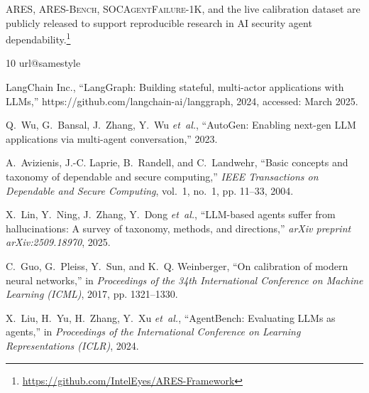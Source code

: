 \documentclass[journal,compsoc]{IEEEtran}
\newcommand{\ARES}{\textsc{ARES}}
\newcommand{\ARESBench}{\textsc{ARES-Bench}}
\newcommand{\SAFK}{\textsc{SOCAgentFailure-1K}}
\begin{document}
\ARES{}, \ARESBench{}, \SAFK{}, and the live calibration dataset are
publicly released to support reproducible research in AI security agent
dependability.\footnote{\url{https://github.com/IntelEyes/ARES-Framework}}


\begin{thebibliography}{10}
\providecommand{\url}[1]{#1}
\csname url@samestyle\endcsname
\providecommand{\newblock}{\relax}
\providecommand{\bibinfo}[2]{#2}
\providecommand{\BIBentrySTDinterwordspacing}{\spaceskip=0pt\relax}
\providecommand{\BIBentryALTinterwordstretchfactor}{4}
\providecommand{\BIBentryALTinterwordspacing}{\spaceskip=\fontdimen2\font plus
\BIBentryALTinterwordstretchfactor\fontdimen3\font minus
  \fontdimen4\font\relax}
\providecommand{\BIBforeignlanguage}[2]{{%
\expandafter\ifx\csname l@#1\endcsname\relax
\typeout{** WARNING: IEEEtran.bst: No hyphenation pattern has been}%
\typeout{** loaded for the language `#1'. Using the pattern for}%
\typeout{** the default language instead.}%
\else
\language=\csname l@#1\endcsname
\fi
#2}}
\providecommand{\BIBdecl}{\relax}
\BIBdecl

{LangChain Inc.}, ``{LangGraph}: Building stateful, multi-actor applications
  with {LLMs},'' \url{https://github.com/langchain-ai/langgraph}, 2024,
  accessed: March 2025.

Q.~Wu, G.~Bansal, J.~Zhang, Y.~Wu \emph{et~al.}, ``{AutoGen}: Enabling next-gen
  {LLM} applications via multi-agent conversation,'' 2023.

A.~Avizienis, J.-C. Laprie, B.~Randell, and C.~Landwehr, ``Basic concepts and
  taxonomy of dependable and secure computing,'' \emph{IEEE Transactions on
  Dependable and Secure Computing}, vol.~1, no.~1, pp. 11--33, 2004.

X.~Lin, Y.~Ning, J.~Zhang, Y.~Dong \emph{et~al.}, ``{LLM}-based agents suffer
  from hallucinations: A survey of taxonomy, methods, and directions,''
  \emph{arXiv preprint arXiv:2509.18970}, 2025.

C.~Guo, G.~Pleiss, Y.~Sun, and K.~Q. Weinberger, ``On calibration of modern
  neural networks,'' in \emph{Proceedings of the 34th International Conference
  on Machine Learning (ICML)}, 2017, pp. 1321--1330.

X.~Liu, H.~Yu, H.~Zhang, Y.~Xu \emph{et~al.}, ``{AgentBench}: Evaluating {LLMs}
  as agents,'' in \emph{Proceedings of the International Conference on Learning
  Representations (ICLR)}, 2024.


\end{thebibliography}
\end{document}
